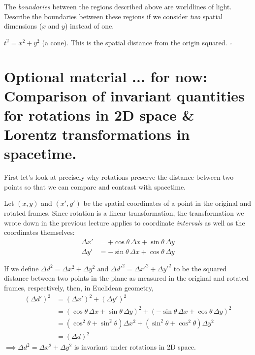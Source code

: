 \documentclass[11pt, letterpaper, openany]{book}
\newenvironment{exercise}[1][Exercise]{%
  \tcolorbox[blanker, breakable, left=1em,
    before skip=1em, after skip=1em,
    borderline west={3pt}{0pt}{PhysNavy},
    colback=PhysCream,
    before upper={\textcolor{PhysNavy}{\sffamily\bfseries #1:}\space}
  ]%
}{%
  \endtcolorbox%
}
\newenvironment{solution}[1][Solution]{%
  \tcolorbox[blanker, breakable, left=1em,
    before skip=1em, after skip=1em,
    borderline west={2pt}{0pt}{PhysTeal},
    colback=PhysCream,
    before upper={\textcolor{PhysTeal}{\sffamily\bfseries #1.}\space}
  ]%
}{%
  \hfill\textcolor{PhysTeal}{\ensuremath{\square}}\endtcolorbox%
}
\begin{document}
\begin{exercise}[Exercise 5]
The \textit{boundaries} between the regions described above are worldlines of light. Describe the boundaries between these regions if we consider \textit{two} spatial dimensions ($x$ and $y$) instead of one.
\end{exercise}
\begin{solution}
$t^2 = x^2 + y^2$ (a cone). This is the spatial distance from the origin squared.
\end{solution}

\section{Optional material ... for now: Comparison of invariant quantities for rotations in 2D space \& Lorentz transformations in spacetime.}

First let's look at precisely why rotations preserve the distance between two points so that we can compare and contrast with spacetime.

Let $(x, y)$ and $(x', y')$ be the spatial coordinates of a point in the original and rotated frames. Since rotation is a linear transformation, the transformation we wrote down in the previous lecture applies to coordinate \textit{intervals} as well as the coordinates themselves:
\begin{align*}
    \Delta x' &= +\cos\theta \, \Delta x + \sin\theta \, \Delta y \\
    \Delta y' &= -\sin\theta \, \Delta x + \cos\theta \, \Delta y 
\end{align*}

If we define $\Delta d^2 = \Delta x^2 + \Delta y^2$ and $\Delta d'^2 = \Delta x'^2 + \Delta y'^2$ to be the squared distance between two points in the plane as measured in the original and rotated frames, respectively, then, in Euclidean geometry,
\begin{align*}
    (\Delta d')^2 &= (\Delta x')^2 + (\Delta y')^2 \\
    &= (\cos\theta \, \Delta x + \sin\theta \, \Delta y)^2 + (-\sin\theta \, \Delta x + \cos\theta \, \Delta y)^2 \tag*{cross terms cancel} \\
    &= (\cos^2\theta + \sin^2\theta)\Delta x^2 + (\sin^2\theta + \cos^2\theta)\Delta y^2 \tag*{use trig identity} \\
    &= (\Delta d)^2
\end{align*}
$\implies \Delta d^2 = \Delta x^2 + \Delta y^2$ is invariant under rotations in 2D space.
\end{document}
